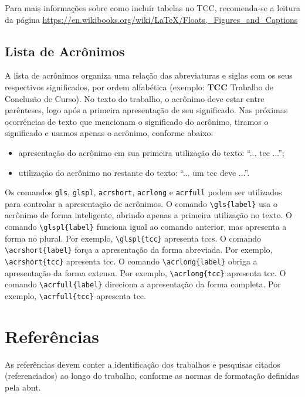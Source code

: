 \documentclass{eic-bcc-tcc}
\begin{document}
Para mais informações sobre como incluir tabelas no TCC, recomenda-se a leitura da página \url{https://en.wikibooks.org/wiki/LaTeX/Floats,_Figures_and_Captions}


\subsection{Lista de Acrônimos}

A lista de acrônimos organiza uma relação das abreviaturas e siglas com os seus respectivos significados, por ordem alfabética (exemplo: \textbf{TCC} Trabalho de Conclusão de Curso). No texto do trabalho, o acrônimo deve estar entre parênteses, logo após a primeira apresentação de seu significado. Nas próximas ocorrências de texto que mencionam o significado do acrônimo, tiramos o significado e usamos apenas o acrônimo, conforme abaixo:
\begin{itemize}
    \item apresentação do acrônimo em sua primeira utilização do texto: ``... \acrfull{tcc} ...'';
    \item utilização do acrônimo no restante do texto: ``... um \acrshort{tcc} deve ...''.
\end{itemize}

Os comandos \texttt{gls}, \texttt{glspl}, \texttt{acrshort}, \texttt{acrlong} e \texttt{acrfull} podem ser utilizados para controlar a apresentação de acrônimos. O comando \verb|\gls{label}| usa o acrônimo de forma inteligente, abrindo apenas a primeira utilização no texto. O comando \verb|\glspl{label}| funciona igual ao comando anterior, mas apresenta a forma no plural. Por exemplo, \verb|\glspl{tcc}| apresenta \glspl{tcc}. O comando \verb|\acrshort{label}| força a apresentação da forma abreviada. Por exemplo, \verb|\acrshort{tcc}| apresenta \acrshort{tcc}. O comando \verb|\acrlong{label}| obriga a apresentação da forma extensa. Por exemplo, \verb|\acrlong{tcc}| apresenta \acrlong{tcc}. O comando \verb|\acrfull{label}| direciona a apresentação da forma completa. Por exemplo, \verb|\acrfull{tcc}| apresenta \acrfull{tcc}.


\section{Referências}

As referências devem conter a identificação dos trabalhos e pesquisas citados (referenciados) ao longo do trabalho, conforme as normas de formatação definidas pela \gls{abnt}.
\end{document}
